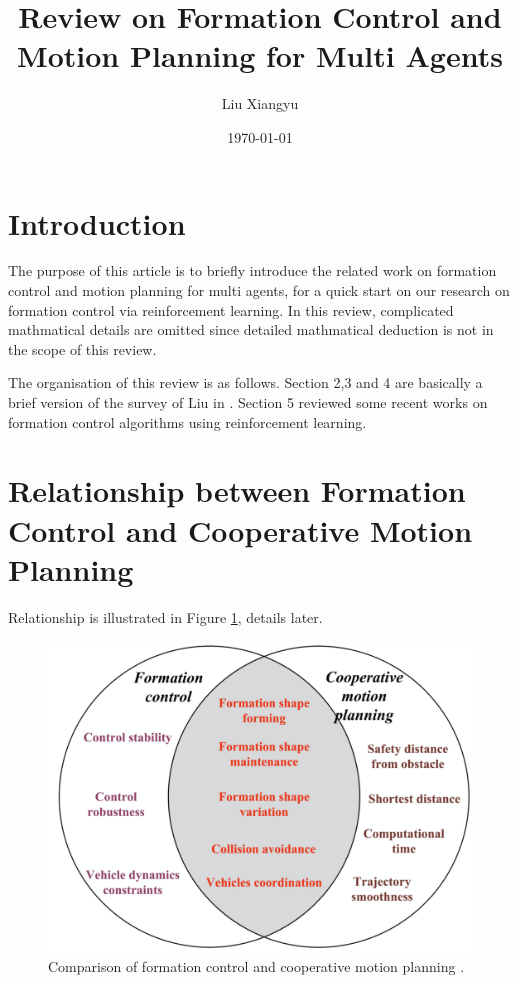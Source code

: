 \documentclass[letterpaper,12pt]{article}
\begin{document}
\title{Review on Formation Control and Motion Planning for Multi Agents}
\author{Liu Xiangyu}
\date{\today}
\maketitle

\section{Introduction}

The purpose of this article is to briefly introduce the related work on formation control and motion planning for multi agents, for a quick start on our research on formation control via reinforcement learning. In this review, complicated mathmatical details are omitted since detailed mathmatical deduction is not in the scope of this review. 

The organisation of this review is as follows. Section 2,3 and 4 are basically a brief version of the survey of Liu in \cite{liu_bucknall_2018}. Section 5 reviewed some recent works on formation control algorithms using reinforcement learning.

\section{Relationship between Formation Control and Cooperative Motion Planning }

Relationship is illustrated in Figure \ref{fig:CompFcCmp}, details later.

\begin{figure}
	\centering
	\includegraphics[width=5in]{WX20200510-222400@2x.png}
	\caption{Comparison of formation control and cooperative motion planning \cite{liu_bucknall_2018}.}
	\label{fig:CompFcCmp} 
\end{figure}
\end{document}
